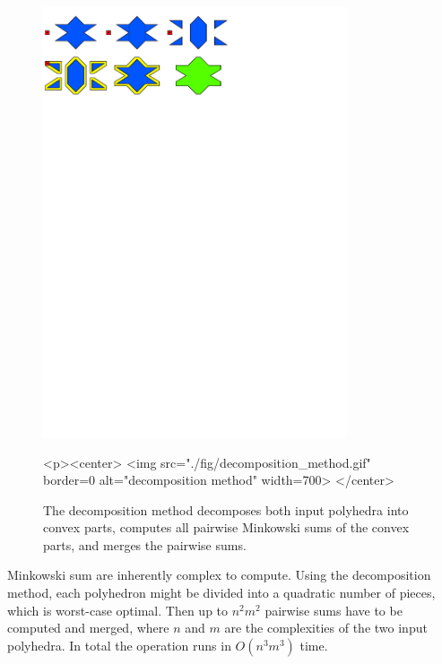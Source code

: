 \begin{figure}[t]
  \begin{ccTexOnly}
    \begin{center}
      \includegraphics[width=0.8\textwidth]{Minkowski_sum_3/fig/decomposition_method}
    \end{center}
  \end{ccTexOnly}
  \begin{ccHtmlOnly}
    <p><center>
    <img src="./fig/decomposition_method.gif" border=0
    alt="decomposition method" width=700>
    </center>
  \end{ccHtmlOnly}
  \caption{The decomposition method decomposes both input polyhedra
           into convex parts, computes all pairwise Minkowski sums
           of the convex parts, and merges the pairwise sums.}
\end{figure}

Minkowski sum are inherently complex to compute. Using the
decomposition method, each polyhedron might be divided into a
quadratic number of pieces, which is worst-case optimal. Then up to
$n^2m^2$ pairwise sums have to be computed and merged, where $n$ and
$m$ are the complexities of the two input polyhedra. In total the
operation runs in $O(n^3m^3)$ time.

